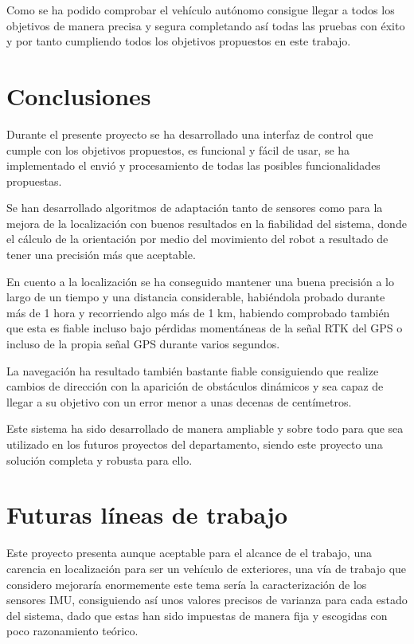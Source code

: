 Como se ha podido comprobar el vehículo autónomo consigue llegar a todos los objetivos de manera precisa y segura completando así todas las pruebas con éxito y por tanto 
cumpliendo todos los objetivos propuestos en este trabajo.

\chapter{Conclusiones}
Durante el presente proyecto se ha desarrollado una interfaz de control que cumple con los objetivos propuestos, es funcional y fácil de usar, 
se ha implementado el envió y procesamiento de todas las posibles funcionalidades propuestas.

Se han desarrollado algoritmos de adaptación tanto de sensores como para la mejora de la localización con buenos resultados en la fiabilidad del sistema, donde el cálculo 
de la orientación por medio del movimiento del robot a resultado de tener una precisión más que aceptable.

En cuento a la localización se ha conseguido mantener una buena precisión a lo largo de un tiempo y una distancia considerable, habiéndola probado durante más de 1 hora 
y recorriendo algo más de 1 km, habiendo comprobado también
que esta es fiable incluso bajo pérdidas momentáneas de la señal RTK del GPS o incluso de la propia señal GPS durante varios segundos.

La navegación ha resultado también bastante fiable consiguiendo que realize cambios de dirección con la aparición de obstáculos dinámicos y sea capaz de 
llegar a su objetivo con un error menor a unas decenas de centímetros.

Este sistema ha sido desarrollado de manera ampliable y sobre todo para que sea utilizado en los futuros proyectos del departamento, 
siendo este proyecto una solución completa y robusta para ello.

\chapter{Futuras líneas de trabajo}

Este proyecto presenta aunque aceptable para el alcance de el trabajo, una carencia en localización para ser un vehículo de exteriores, 
una vía de trabajo que considero mejoraría enormemente este tema sería la caracterización de los sensores IMU, consiguiendo así unos 
valores precisos de varianza para cada estado del sistema, dado que estas han sido impuestas de manera fija y escogidas con poco 
razonamiento teórico.

